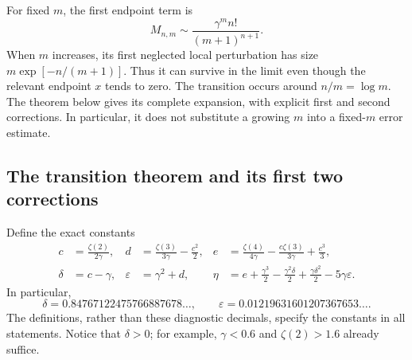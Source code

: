 \documentclass[11pt,a4paper]{article}
\numberwithin{equation}{section}
\theoremstyle{plain}
\theoremstyle{definition}
\theoremstyle{remark}
\begin{document}
For fixed $m$, the first endpoint term is
\[
 M_{n,m}\sim\frac{\gamma^m n!}{(m+1)^{n+1}}.
\]
When $m$ increases, its first neglected local perturbation has size
$m\exp[-n/(m+1)]$. Thus it can survive in the limit even though the
relevant endpoint $x$ tends to zero. The transition occurs around
$n/m=\log m$. The theorem below gives its complete expansion, with
explicit first and second corrections. In particular, it does not
substitute a growing $m$ into a fixed-$m$ error estimate.

\subsection{The transition theorem and its first two corrections}

Define the exact constants
\begin{align}
 c&=\frac{\zeta(2)}{2\gamma},&
 d&=\frac{\zeta(3)}{3\gamma}-\frac{c^2}{2},&
 e&=\frac{\zeta(4)}{4\gamma}
       -\frac{c\zeta(3)}{3\gamma}+\frac{c^3}{3},\label{joint:eq:constants1}\\
 \delta&=c-\gamma,&
 \varepsilon&=\gamma^2+d,&
 \eta&=e+\frac{\gamma^3}{2}-\frac{\gamma^2\delta}{2}
          +\frac{\gamma\delta^2}{2}-5\gamma\varepsilon.
 \label{joint:eq:constants2}
\end{align}
In particular,
\[
 \delta=0.84767122475766887678\ldots,
 \qquad
 \varepsilon=0.01219631601207367653\ldots.
\]
The definitions, rather than these diagnostic decimals, specify the
constants in all statements. Notice that $\delta>0$; for example,
$\gamma<0.6$ and $\zeta(2)>1.6$ already suffice.
\end{document}
